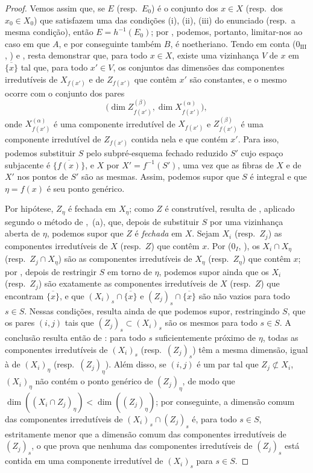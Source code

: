 \begin{proof}
Vemos assim que, se $E$ (resp.~$E_0$) é o conjunto dos $x\in X$ (resp.~dos $x_0\in X_0$) que satisfazem uma das condições (i), (ii), (iii) do enunciado (resp.~a mesma condição), então $E=h^{-1}(E_0)$; por , podemos, portanto, limitar-nos ao caso em que $A$, e por conseguinte também $B$, é noetheriano.
Tendo em conta ($0_{\mathrm{III}}$, ) e , resta demonstrar que, para todo $x\in X$, existe uma vizinhança $V$ de $x$ em $\overline{\{x\}}$ tal que, para todo $x'\in V$, os conjuntos das dimensões das componentes irredutíveis de $X_{f(x')}$ e de $Z_{f(x')}$ que contêm $x'$ são constantes, e o mesmo ocorre com o conjunto dos pares
\[
  \bigl(\dim Z_{f(x')}^{(\beta)},\dim X_{f(x')}^{(\alpha)}\bigr),
\]
onde $X_{f(x')}^{(\alpha)}$ é uma componente irredutível de $X_{f(x')}$ e $Z_{f(x')}^{(\beta)}$ é uma componente irredutível de $Z_{f(x')}$ contida nela e que contém $x'$.
Para isso, podemos substituir $S$ pelo subpré-esquema fechado reduzido $S'$ cujo espaço subjacente é $\overline{\{f(x)\}}$, e $X$ por $X'=f^{-1}(S')$, uma vez que as fibras de $X$ e de $X'$ nos pontos de $S'$ são as mesmas.
Assim, podemos supor que $S$ é integral e que $\eta=f(x)$ é seu ponto genérico.

Por hipótese, $Z_\eta$ é fechada em $X_\eta$; como $Z$ é construtível, resulta de , aplicado segundo o método de ,~(a), que, depois de substituir $S$ por uma vizinhança aberta de $\eta$, podemos supor que $Z$ é \emph{fechada} em $X$.
Sejam $X_i$ (resp.~$Z_j$) as componentes irredutíveis de $X$ (resp.~$Z$) que contêm $x$.
Por ($0_I$, ), os $X_i\cap X_\eta$ (resp.~$Z_j\cap X_\eta$) são as componentes irredutíveis de $X_\eta$ (resp.~$Z_\eta$) que contêm $x$; por , depois de restringir $S$ em torno de $\eta$, podemos supor ainda que os $X_i$ (resp.~$Z_j$) são exatamente as componentes irredutíveis de $X$ (resp.~$Z$) que encontram $\overline{\{x\}}$, e que $(X_i)_s\cap\overline{\{x\}}$ e $(Z_j)_s\cap\overline{\{x\}}$ são não vazios para todo $s\in S$.
Nessas condições, resulta ainda de  que podemos supor, restringindo $S$, que os pares $(i,j)$ tais que $(Z_j)_s\subset(X_i)_s$ são os mesmos para todo $s\in S$.
A conclusão resulta então de : para todo $s$ suficientemente próximo de $\eta$, todas as componentes irredutíveis de $(X_i)_s$ (resp.~$(Z_j)_s$) têm a mesma dimensão, igual à de $(X_i)_\eta$ (resp.~$(Z_j)_\eta$).
Além disso, se $(i,j)$ é um par tal que $Z_j\not\subset X_i$, $(X_i)_\eta$ não contém o
ponto genérico de $(Z_j)_\eta$, de modo que $\dim((X_i\cap Z_j)_\eta)<\dim((Z_j)_\eta)$; por conseguinte, a dimensão comum das componentes irredutíveis de $(X_i)_s\cap(Z_j)_s$ é, para todo $s\in S$, estritamente menor que a dimensão comum das componentes irredutíveis de $(Z_j)_s$, o que prova que nenhuma das componentes irredutíveis de $(Z_j)_s$ está contida em uma componente irredutível de $(X_i)_s$ para $s\in S$.
\end{proof}

